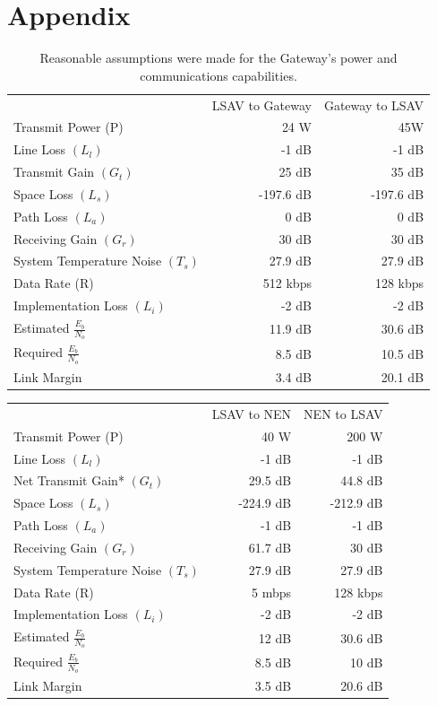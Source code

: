 \documentclass[10pt]{article}
\begin{document}
\newpage
\section{Appendix}

\begin{table}
  \centering
  \caption{Reasonable assumptions were made for the Gateway's power
    and communications capabilities.}
  \label{table:linkbudgetlsav}
  \begin{tabular}{lrr}
    {} & LSAV to Gateway &Gateway to LSAV \\

    Transmit Power (P)&24 W&45W \\

    Line  Loss \((L_l)\)&-1 dB&-1 dB \\
    Transmit Gain \((G_t)\)&25 dB&35 dB \\
    Space Loss \((L_s)\)&-197.6 dB&-197.6 dB \\
    Path Loss \((L_a)\)&0 dB&0 dB \\
    Receiving Gain \((G_r)\)&30 dB&30 dB \\
    System Temperature Noise \((T_s)\)&27.9 dB&27.9 dB \\
    Data Rate (R)&512 kbps&128 kbps \\
    Implementation Loss \((L_i)\)&-2 dB&-2 dB \\
    Estimated \(\frac{E_b}{N_o}\)&11.9 dB&30.6 dB \\
    Required \(\frac{E_b}{N_o}\)&8.5 dB&10.5 dB \\
    Link Margin&3.4 dB&20.1 dB \\

  \end{tabular}
\end{table}

\begin{tabular}{lrr}
  &LSAV to NEN&NEN to LSAV \\
  Transmit Power (P)&40 W&200 W \\
  Line  Loss \((L_l)\)&-1 dB&-1 dB \\
  Net Transmit Gain* \((G_t)\)&29.5 dB&44.8 dB \\
  Space Loss \((L_s)\)&-224.9 dB&-212.9 dB \\
  Path Loss \((L_a)\)&-1 dB&-1 dB \\
  Receiving Gain \((G_r)\)&61.7 dB&30 dB \\
  System Temperature Noise \((T_s)\)&27.9 dB&27.9 dB \\
  Data Rate (R)&5 mbps&128 kbps \\
  Implementation Loss \((L_i)\)&-2 dB&-2 dB \\
  Estimated \(\frac{E_b}{N_o}\)&12 dB&30.6 dB \\
  Required \(\frac{E_b}{N_o}\)&8.5 dB&10 dB \\
  Link Margin&3.5 dB&20.6 dB \\
\end{tabular}
\end{document}
